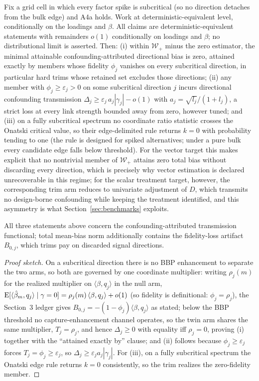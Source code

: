 \begin{theorem}
\label{thm:hardtrim}
Fix a grid cell in which every factor spike is subcritical (so no direction detaches from the bulk edge) and A4a holds. Work at deterministic-equivalent level, conditionally on the loadings and $\beta$. All claims are deterministic-equivalent statements with remainders $o(1)$ conditionally on loadings and $\beta$; no distributional limit is asserted. Then: (i) within $\mathcal{W}_+$ minus the zero estimator, the minimal attainable confounding-attributed directional bias is zero, attained exactly by members whose fidelity $\phi_j$ vanishes on every subcritical direction, in particular hard trims whose retained set excludes those directions; (ii) any member with $\phi_j \ge \varepsilon_j > 0$ on some subcritical direction $j$ incurs directional confounding transmission $\Delta_j \ge \varepsilon_j\, a_j |\gamma_j| - o(1)$ with $a_j = \sqrt{l_j}/(1+l_j)$, a strict loss at every link strength bounded away from zero, however tuned; and (iii) on a fully subcritical spectrum no coordinate ratio statistic crosses the Onatski critical value, so their edge-delimited rule \citep{onatski2010determining} returns $k=0$ with probability tending to one (the rule is designed for spiked alternatives; under a pure bulk every candidate edge falls below threshold). For the vector target this makes explicit that no nontrivial member of $\mathcal{W}_+$ attains zero total bias without discarding every direction, which is precisely why vector estimation is declared unrecoverable in this regime; for the scalar treatment target, however, the corresponding trim arm reduces to univariate adjustment of $D$, which transmits no design-borne confounding while keeping the treatment identified, and this asymmetry is what Section~\ref{sec:benchmarks} exploits.
\end{theorem}

All three statements above concern the confounding-attributed transmission functional; total mean-bias norm additionally contains the fidelity-loss artifact $B_{0,j}$, which trims pay on discarded signal directions.

\begin{proof}[Proof sketch]
On a subcritical direction there is no BBP enhancement to separate the two arms, so both are governed by one coordinate multiplier: writing $\rho_j(m)$ for the realized multiplier on $\langle\beta,q_j\rangle$ in the null arm, $\mathrm{E}[\langle\hat\beta_m,q_j\rangle\mid\gamma=0]=\rho_j(m)\,\langle\beta,q_j\rangle+o(1)$ (so fidelity is definitional: $\phi_j=\rho_j$), the Section~3 ledger gives $B_{0,j}=-(1-\phi_j)\langle\beta,q_j\rangle$ as stated; below the BBP threshold no capture-enhancement channel operates, so the twin arm shares the same multiplier, $T_j=\rho_j$, and hence $\Delta_j\ge0$ with equality iff $\rho_j=0$, proving (i) together with the ``attained exactly by'' clause; and (ii) follows because $\phi_j\ge\varepsilon_j$ forces $T_j=\phi_j\ge\varepsilon_j$, so $\Delta_j\ge\varepsilon_j a_j|\gamma_j|$. For (iii), on a fully subcritical spectrum the Onatski edge rule returns $k=0$ consistently, so the trim realizes the zero-fidelity member.
\end{proof}

